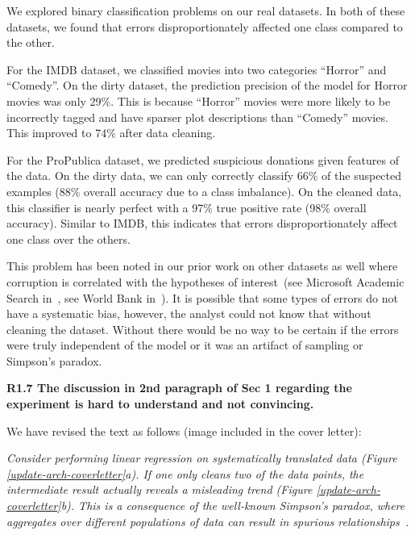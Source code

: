 \noindent  We explored binary classification problems on our real datasets. In both of these datasets, we found that errors disproportionately affected one class compared to the other.

For the IMDB dataset, we classified movies into two categories ``Horror'' and ``Comedy''. 
On the dirty dataset, the prediction precision of the model for Horror movies was only 29\%.
This is because ``Horror'' movies were more likely to be incorrectly tagged and have sparser plot descriptions than ``Comedy'' movies.
This improved to 74\% after data cleaning. 

For the ProPublica dataset, we predicted suspicious donations given features of the data.  
On the dirty data, we can only correctly classify 66\% of the suspected examples (88\% overall accuracy due to a class imbalance).
On the cleaned data, this classifier is nearly perfect with a 97\% true positive rate (98\% overall accuracy).
Similar to IMDB, this indicates that errors disproportionately affect one class over the others.

This problem has been noted in our prior work on other datasets as well where corruption is correlated with the hypotheses of interest~(see Microsoft Academic Search in~\cite{wang1999sample}, see World Bank in~\cite{activecleanarxiv}). It is possible that some types of errors do not have a systematic bias, however, the analyst could not know that without cleaning the dataset.
Without \sys there would be no way to be certain if the errors were truly independent of the model or it was an artifact of sampling or Simpson's paradox.

\vspace{0.5em}

\noindent\textbf{R1.7 The discussion in 2nd paragraph of Sec 1 regarding the experiment is hard to understand and not convincing.}

\noindent We have revised the text as follows (image included in the cover letter):

\emph{Consider performing linear regression on systematically translated data (Figure \ref{update-arch-coverletter}a).
If one only cleans two of the data points, the intermediate result actually reveals a misleading trend (Figure \ref{update-arch-coverletter}b).
This is a consequence of the well-known Simpson's paradox, where aggregates over different populations of data can result in spurious relationships~\cite{simpson1951interpretation}.}

